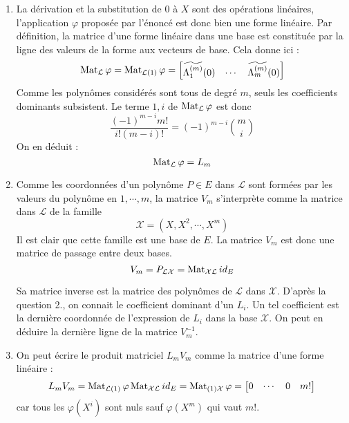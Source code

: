 \begin{enumerate}
\item La dérivation et la substitution de $0$ à $X$ sont des opérations linéaires, l'application $\varphi$ proposée par l'énoncé est donc bien une forme linéaire. Par définition, la matrice d'une forme linéaire dans une base est constituée par la ligne des valeurs de la forme aux vecteurs de base. Cela donne ici :
\begin{displaymath}
 \operatorname{Mat}_{\mathcal L}\varphi = \operatorname{Mat}_{\mathcal L (1)} \varphi =
\begin{bmatrix}
 \widetilde{\Lambda_1^{(m)}}(0) & \cdots & \widetilde{\Lambda_m^{(m)}}(0)
\end{bmatrix}
\end{displaymath}
Comme les polynômes considérés sont tous de degré $m$, seuls les coefficients dominants subsistent. Le terme $1,i$ de $\operatorname{Mat}_{\mathcal L}\varphi$ est donc 
\begin{displaymath}
 \dfrac{(-1)^{m-i}m!}{i!(m-i)!}= (-1)^{m-i}\binom{m}{i}
\end{displaymath}
On en déduit :
\begin{displaymath}
 \operatorname{Mat}_\mathcal L \varphi = L_m
\end{displaymath}

\item Comme les coordonnées d'un polynôme $P\in E$ dans $\mathcal L$ sont formées par les valeurs du polynôme en $1,\cdots ,m$, la matrice $V_m$ s'interprète comme la matrice dans $\mathcal L$ de la famille 
\begin{displaymath}
 \mathcal X =(X,X^2,\cdots,X^m)
\end{displaymath}
Il est clair que cette famille est une base de $E$. La matrice $V_m$ est donc une matrice de passage entre deux bases.
\begin{displaymath}
 V_m = P_{\mathcal L \mathcal X} = \operatorname{Mat}_{\mathcal X \mathcal L}id_E 
\end{displaymath}

Sa matrice inverse est la matrice des polynômes de $\mathcal L$ dans $\mathcal X$. D'après la question 2., on connait le coefficient dominant d'un $L_i$. Un tel coefficient est la dernière coordonnée de l'expression de $L_i$ dans la base $\mathcal X$. On peut en déduire la dernière ligne de la matrice $V_m^{-1}$.
\item On peut écrire le produit matriciel $L_mV_m$ comme la matrice d'une forme linéaire :
\begin{displaymath}
 L_mV_m = \operatorname{Mat}_{\mathcal L (1)}\varphi \operatorname{Mat}_{\mathcal X \mathcal L}id_E 
= \operatorname{Mat}_{(1)\mathcal X} \varphi 
= \begin{bmatrix}
   0 & \cdots & 0 & m!
  \end{bmatrix}
\end{displaymath}
car tous les $\varphi(X^i)$ sont nuls sauf $\varphi(X^m)$ qui vaut $m!$.
\end{enumerate}

